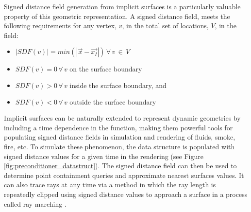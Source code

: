 


Signed distance field generation from implicit surfaces is a particularly
valuable property of this geometric representation. A signed distance field,
meets the following requirements for any vertex, $v$, in the
total set of locations, $V$, in the field:

\begin{itemize}
\item $ |SDF(v)| = min(|\vec{x}-\vec{x_I}|) \, \forall \, v \, \in \, V$
\item $ SDF(v) = 0 \, \forall \, v$ on the surface boundary
\item $ SDF(v) > 0 \, \forall \, v$ inside the surface boundary, and
\item $ SDF(v) < 0 \, \forall \, v$ outside the surface boundary
\end{itemize}

Implicit surfaces can be naturally extended to represent dynamic geometries by
including a time dependence in the function, making them powerful tools for
populating signed distance fields in simulation and rendering of fluids, smoke,
fire, etc. To simulate these phenomenon, the data structure is populated with
signed distance values for a given time in the rendering (see Figure
\ref{fig:preconditioner_datastruct}). The signed distance field can then be used
to determine point containment queries and approximate nearest surfaces
values. It can also trace rays at any time via a method in which the ray length
is repeatedly clipped using signed distance values to approach a surface in a
process called ray marching \cite{Tomczak_2012}.


